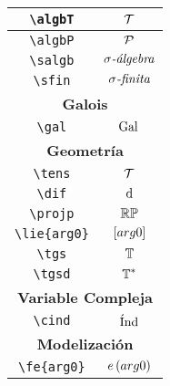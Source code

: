 \begin{longtable}{|c|c|}
\verb|\algbT| & $\displaystyle\mathcal{T}$ \\ \hline 
\verb|\algbP| & $\displaystyle\mathcal{P}$ \\ \hline 
\verb|\salgb| & $\displaystyle\sigma \textit{-\'{a}lgebra}$ \\ \hline 
\verb|\sfin| & $\displaystyle\sigma \textit{-finita}$ \\ \hline 
\multicolumn{2}{|c|}{\textbf{Galois}} \\ \hline 
\verb|\gal| & $\displaystyle\mathrm{Gal}\,$ \\ \hline 
\multicolumn{2}{|c|}{\textbf{Geometría}} \\ \hline 
\verb|\tens| & $\displaystyle\mathcal{T}$ \\ \hline 
\verb|\dif| & $\displaystyle\mathrm{d}$ \\ \hline 
\verb|\projp| & $\displaystyle\mathbb{RP}$ \\ \hline 
\verb|\lie{arg0}| & $\displaystyle\left[arg0\right]$ \\ \hline 
\verb|\tgs| & $\displaystyle\mathbb{T}$ \\ \hline 
\verb|\tgsd| & $\displaystyle\mathbb{T}^*$ \\ \hline 
\multicolumn{2}{|c|}{\textbf{Variable Compleja}} \\ \hline 
\verb|\cind| & $\displaystyle\operatorname{\acute{I}nd}$ \\ \hline 
\multicolumn{2}{|c|}{\textbf{Modelización}} \\ \hline 
\verb|\fe{arg0}| & $\displaystyle e\left(arg0\right)$ \\ \hline 
\end{longtable}
